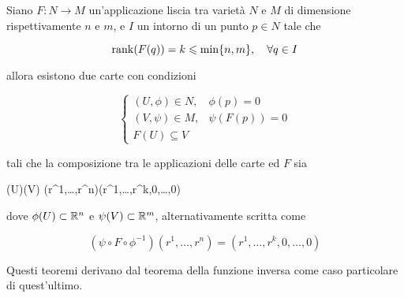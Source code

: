 \begin{theorem}\label{thm:const-rank}
	Siano $ F : N \to M $ un'applicazione liscia tra varietà $ N $ e $ M $ di dimensione rispettivamente $ n $ e $ m $, e $ I $ un intorno di un punto $ p \in N $ tale che
	
	\begin{equation}
		\rank(F(q)) = k \leqslant \min\{n,m\} \qcomma \forall q \in I
	\end{equation}

	allora esistono due carte con condizioni
	
	\begin{equation}
		\begin{cases}
			(U,\phi) \in N, & \phi(p) = 0 \\
			(V,\psi) \in M, & \psi(F(p)) = 0 \\
			F(U) \subseteq V
		\end{cases}
	\end{equation}

	tali che la composizione tra le applicazioni delle carte ed $ F $ sia
	
		{\phi(U)}{\psi(V)}
		{(r^{1},\dots,r^{n})}{(r^{1},\dots,r^{k},0,\dots,0)}

	dove $ \phi(U) \subset \mathbb{R}^{n} $ e $ \psi(V) \subset \mathbb{R}^{m} $, alternativamente scritta come
	
	\begin{equation}
		(\psi \circ F \circ \phi^{-1})(r^{1},\dots,r^{n}) = (r^{1},\dots,r^{k},0,\dots,0)
	\end{equation}
\end{theorem}

Questi teoremi derivano dal teorema della funzione inversa come caso particolare di quest'ultimo.

